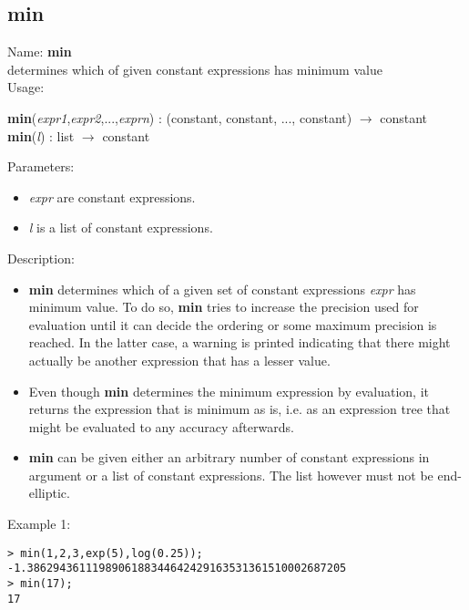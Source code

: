 \subsection{min}
\label{labmin}
\noindent Name: \textbf{min}\\
determines which of given constant expressions has minimum value\\
\noindent Usage: 
\begin{center}
\textbf{min}(\emph{expr1},\emph{expr2},...,\emph{exprn}) : (\textsf{constant}, \textsf{constant}, ..., \textsf{constant}) $\rightarrow$ \textsf{constant}\\
\textbf{min}(\emph{l}) : \textsf{list} $\rightarrow$ \textsf{constant}\\
\end{center}
Parameters: 
\begin{itemize}
\item \emph{expr} are constant expressions.
\item \emph{l} is a list of constant expressions.
\end{itemize}
\noindent Description: \begin{itemize}

\item \textbf{min} determines which of a given set of constant expressions
   \emph{expr} has minimum value. To do so, \textbf{min} tries to increase the
   precision used for evaluation until it can decide the ordering or some
   maximum precision is reached. In the latter case, a warning is printed
   indicating that there might actually be another expression that has a
   lesser value.

\item Even though \textbf{min} determines the minimum expression by evaluation, it 
   returns the expression that is minimum as is, i.e. as an expression
   tree that might be evaluated to any accuracy afterwards.

\item \textbf{min} can be given either an arbitrary number of constant
   expressions in argument or a list of constant expressions. The list
   however must not be end-elliptic.
\end{itemize}
\noindent Example 1: 
\begin{center}\begin{minipage}{15cm}\begin{Verbatim}[frame=single]
> min(1,2,3,exp(5),log(0.25));
-1.3862943611198906188344642429163531361510002687205
> min(17);
17
\end{Verbatim}
\end{minipage}\end{center}

